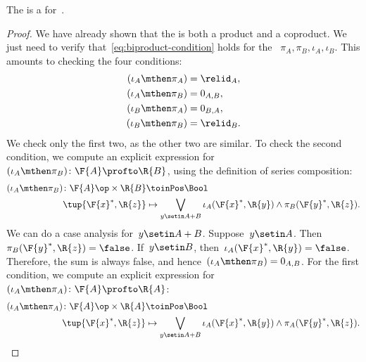 \begin{lemma}
    The  is a  for~\DP.
\end{lemma}
\begin{proof}
    We have already shown that the  is both a product and a coproduct.
    We just need to verify that~\cref{eq:biproduct-condition} holds for the ~$\pi_A, \pi_B, \iota_A, \iota_B$.
    This amounts to checking the four conditions:
    \begin{equation}
        \begin{aligned}
            (\iota_A\mthen \pi_A)
                                  & = \relid_{A}, \\
            (\iota_A\mthen \pi_B) & = 0_{A,B}, \\
            (\iota_B\mthen \pi_A) & = 0_{B,A}, \\
            (\iota_B\mthen \pi_B) & = \relid_{B}.
        \end{aligned}
    \end{equation}
    We check only the first two, as the other two are similar.
    To check the second condition, we compute an explicit expression for~$(\iota_A\mthen \pi_B)\colon \F{A} \profto \R{B}$, using the definition of  series composition:
    \begin{equation}
        \begin{aligned}
            (\iota_A\mthen \pi_B)
            \colon  \F{A}\op\times \R{B} & \toinPos \Bool \\
            \tup{\F{x}^*, \R{z}}         & \mapsto
            \bigvee_{y \setin A + B} \iota_A(\F{x}^*,\R{y}) \wedge \pi_B(\F{y}^*,\R{z}).
        \end{aligned}
    \end{equation}
    We can do a case analysis for~$y\setin A+B$.
    Suppose~$y\setin A$.
    Then~$\pi_B(\F{y}^*,\R{z}) = \false$.
    If~$y \setin B$, then~$\iota_A(\F{x}^*,\R{y}) = \false$.
    Therefore, the sum is always false, and hence~$(\iota_A\mthen \pi_B) = 0_{A,B}$.
    For the first condition, we compute an explicit expression for~$(\iota_A\mthen \pi_A) \colon \F{A} \profto \R{A}$:
    \begin{equation}
        \begin{aligned}
            (\iota_A\mthen \pi_A)
            \colon  \F{A}\op\times \R{A} & \toinPos \Bool \\
            \tup{\F{x}^*, \R{z}}         & \mapsto
            \bigvee_{y \setin A + B} \iota_A(\F{x}^*,\R{y}) \wedge \pi_A(\F{y}^*,\R{z}).

\end{aligned}
\end{equation}
\end{proof}
